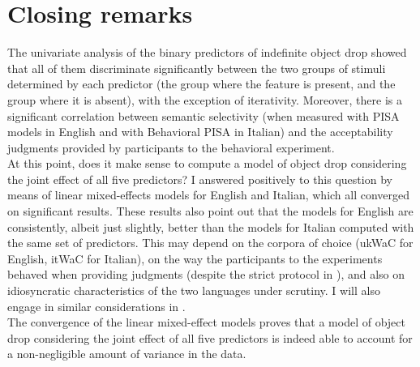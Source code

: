 \section{Closing remarks} 

The univariate analysis of the binary predictors of indefinite object drop showed that all of them discriminate significantly between the two groups of stimuli determined by each predictor (the group where the feature is present, and the group where it is absent), with the exception of iterativity. Moreover, there is a significant correlation between semantic selectivity (when measured with PISA models in English and with Behavioral PISA in Italian) and the acceptability judgments provided by participants to the behavioral experiment.\\
At this point, does it make sense to compute a model of object drop considering the joint effect of all five predictors? I answered positively to this question by means of linear mixed-effects models for English and Italian, which all converged on significant results. These results also point out that the models for English are consistently, albeit just slightly, better than the models for Italian computed with the same set of predictors. This may depend on the corpora of choice (ukWaC for English, itWaC for Italian), on the way the participants to the experiments behaved when providing judgments (despite the strict protocol in ), and also on idiosyncratic characteristics of the two languages under scrutiny. I will also engage in similar considerations in .\\
The convergence of the linear mixed-effect models proves that a model of object drop considering the joint effect of all five predictors is indeed able to account for a non-negligible amount of variance in the data. %
